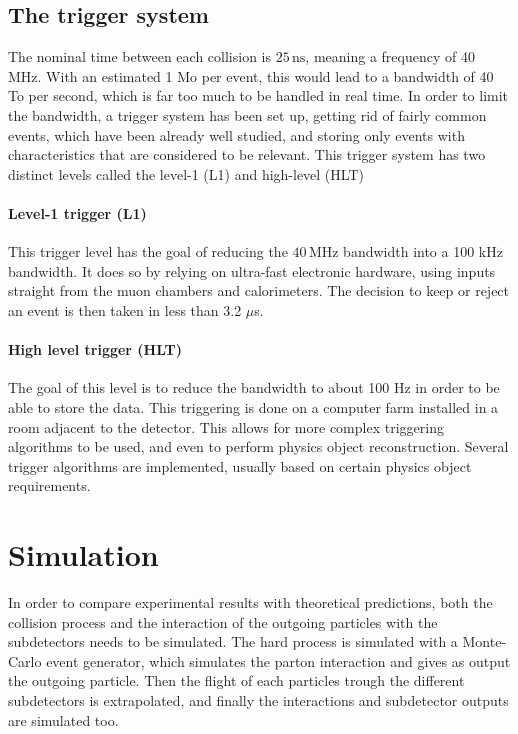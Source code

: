 \subsection{The trigger system}
\label{sec:trigger}

The nominal time between each collision is $25\,\mathrm{ns}$, meaning a frequency of 40 MHz. With an estimated 1 Mo per event, this would lead to a bandwidth of 40 To per second, which is far too much to be handled in real time. In order to limit the bandwidth, a trigger system has been set up, getting rid of fairly common events, which have been already well studied, and storing only events with characteristics that are considered to be relevant. This trigger system has two distinct levels called the level-1 (L1) and high-level (HLT)

\paragraph{Level-1 trigger (L1)} This trigger level has the goal of reducing the $40\,\mathrm{MHz}$ bandwidth into a 100 kHz bandwidth. It does so by relying on ultra-fast electronic hardware, using inputs straight from the muon chambers and calorimeters. The decision to keep or reject an event is then taken in less than 3.2 $\mu$s. 

\paragraph{High level trigger (HLT)} The goal of this level is to reduce the bandwidth to about 100 Hz in order to be able to store the data. This triggering is done on a computer farm installed in a room adjacent to the detector. This allows for more complex triggering algorithms to be used, and even to perform physics object reconstruction. Several trigger algorithms are implemented, usually based on certain physics object requirements.

\section{Simulation}
\label{sec:simulation}

In order to compare experimental results with theoretical predictions, both the collision process and the interaction of the outgoing particles with the subdetectors needs to be simulated. The hard process is simulated with a Monte-Carlo event generator, which simulates the parton interaction and gives as output the outgoing particle. Then the flight of each particles trough the different subdetectors is extrapolated, and finally the interactions and subdetector outputs are simulated too.

